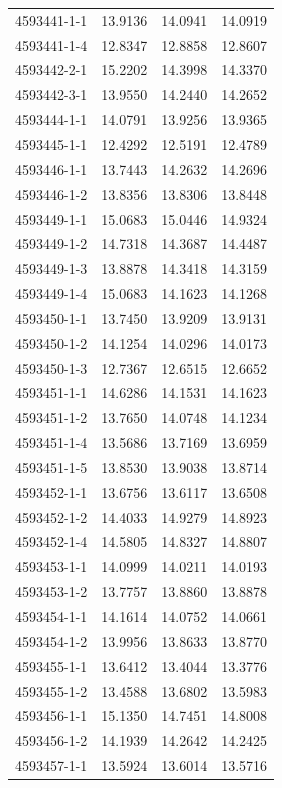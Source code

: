 \begin{longtable}{lrrr}
4593441-1-1 & 13.9136 & 14.0941 & 14.0919 \\
4593441-1-4 & 12.8347 & 12.8858 & 12.8607 \\
4593442-2-1 & 15.2202 & 14.3998 & 14.3370 \\
4593442-3-1 & 13.9550 & 14.2440 & 14.2652 \\
4593444-1-1 & 14.0791 & 13.9256 & 13.9365 \\
4593445-1-1 & 12.4292 & 12.5191 & 12.4789 \\
4593446-1-1 & 13.7443 & 14.2632 & 14.2696 \\
4593446-1-2 & 13.8356 & 13.8306 & 13.8448 \\
4593449-1-1 & 15.0683 & 15.0446 & 14.9324 \\
4593449-1-2 & 14.7318 & 14.3687 & 14.4487 \\
4593449-1-3 & 13.8878 & 14.3418 & 14.3159 \\
4593449-1-4 & 15.0683 & 14.1623 & 14.1268 \\
4593450-1-1 & 13.7450 & 13.9209 & 13.9131 \\
4593450-1-2 & 14.1254 & 14.0296 & 14.0173 \\
4593450-1-3 & 12.7367 & 12.6515 & 12.6652 \\
4593451-1-1 & 14.6286 & 14.1531 & 14.1623 \\
4593451-1-2 & 13.7650 & 14.0748 & 14.1234 \\
4593451-1-4 & 13.5686 & 13.7169 & 13.6959 \\
4593451-1-5 & 13.8530 & 13.9038 & 13.8714 \\
4593452-1-1 & 13.6756 & 13.6117 & 13.6508 \\
4593452-1-2 & 14.4033 & 14.9279 & 14.8923 \\
4593452-1-4 & 14.5805 & 14.8327 & 14.8807 \\
4593453-1-1 & 14.0999 & 14.0211 & 14.0193 \\
4593453-1-2 & 13.7757 & 13.8860 & 13.8878 \\
4593454-1-1 & 14.1614 & 14.0752 & 14.0661 \\
4593454-1-2 & 13.9956 & 13.8633 & 13.8770 \\
4593455-1-1 & 13.6412 & 13.4044 & 13.3776 \\
4593455-1-2 & 13.4588 & 13.6802 & 13.5983 \\
4593456-1-1 & 15.1350 & 14.7451 & 14.8008 \\
4593456-1-2 & 14.1939 & 14.2642 & 14.2425 \\
4593457-1-1 & 13.5924 & 13.6014 & 13.5716 \\

\end{longtable}

